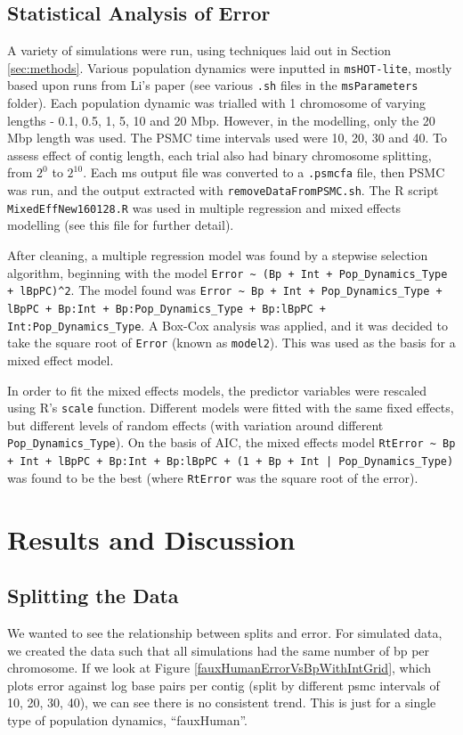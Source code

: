 \documentclass[11pt,a4paper]{article}
\begin{document}
\subsection{Statistical Analysis of Error}
A variety of simulations were run, using techniques laid out in Section \ref{sec:methods}. Various population dynamics were inputted in \verb|msHOT-lite|, mostly based upon runs from Li's paper \cite{li2011inference} (see various \verb|.sh| files in the \verb|msParameters| folder). Each population dynamic was trialled with 1 chromosome of varying lengths - 0.1, 0.5, 1, 5, 10 and 20 Mbp. However, in the modelling, only the 20 Mbp length was used. The PSMC time intervals used were 10, 20, 30 and 40. To assess effect of contig length, each trial also had binary chromosome splitting, from $2^0$ to $2^{10}$. Each ms output file was converted to a \verb|.psmcfa| file, then PSMC was run, and the output extracted with \verb|removeDataFromPSMC.sh|. The R script \verb|MixedEffNew160128.R| was used in multiple regression and mixed effects modelling (see this file for further detail).

After cleaning, a multiple regression model was found by a stepwise selection algorithm, beginning with the model \verb|Error ~ (Bp + Int + Pop_Dynamics_Type + lBpPC)^2|. The model found was \verb|Error ~ Bp + Int + Pop_Dynamics_Type + lBpPC + Bp:Int + Bp:Pop_Dynamics_Type + Bp:lBpPC + Int:Pop_Dynamics_Type|. A Box-Cox analysis was applied, and it was decided to take the square root of \verb|Error| (known as \verb|model2|). This was used as the basis for a mixed effect model.

In order to fit the mixed effects models, the predictor variables were rescaled using R's \verb|scale| function. Different models were fitted with the same fixed effects, but different levels of random effects (with variation around different \verb|Pop_Dynamics_Type|). On the basis of AIC, the mixed effects model \verb;RtError ~ Bp + Int + lBpPC + Bp:Int + Bp:lBpPC + (1 + Bp + Int | Pop_Dynamics_Type); was found to be the best (where \verb|RtError| was the square root of the error).



\section{Results and Discussion}

\subsection{Splitting the Data}
We wanted to see the relationship between splits and error. For simulated data, we created the data such that all simulations had the same number of bp per chromosome. If we look at Figure \ref{fauxHumanErrorVsBpWithIntGrid}, which plots error against log base pairs per contig (split by different psmc intervals of 10, 20, 30, 40), we can see there is no consistent trend. This is just for a single type of population dynamics, ``fauxHuman''.
\end{document}
